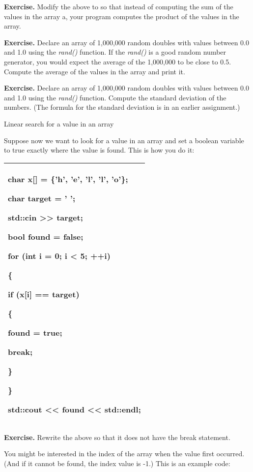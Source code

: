 \documentclass[
]{article}
\begin{document}
\textbf{Exercise.} Modify the above to so that instead of computing the
sum of the values in the array a, your program computes the product of
the values in the array.

\textbf{Exercise.} Declare an array of 1,000,000 random doubles with
values between 0.0 and 1.0 using the \emph{rand()} function. If the
\emph{rand()} is a good random number generator, you would expect the
average of the 1,000,000 to be close to 0.5. Compute the average of the
values in the array and print it.

\textbf{Exercise.} Declare an array of 1,000,000 random doubles with
values between 0.0 and 1.0 using the \emph{rand()} function. Compute the
standard deviation of the numbers. (The formula for the standard
deviation is in an earlier assignment.)

Linear search for a value in an array

Suppose now we want to look for a value in an array and set a boolean
variable to true exactly where the value is found. This is how you do
it:

\begin{longtable}[]{@{}l@{}}
\toprule
\endhead
\begin{minipage}[t]{0.97\columnwidth}\raggedright
char x{[}{]} = \{'h', 'e', 'l', 'l', 'o'\};

char target = ' ';

std::cin \textgreater\textgreater{} target;

bool found = false;

for (int i = 0; i \textless{} 5; ++i)

\{

if (x{[}i{]} == target)

\{

found = true;

break;

\}

\}

std::cout \textless\textless{} found \textless\textless{}
std::endl;\strut
\end{minipage}\tabularnewline
\bottomrule
\end{longtable}

\textbf{Exercise.} Rewrite the above so that it does not have the break
statement.

You might be interested in the index of the array when the value first
occurred. (And if it cannot be found, the index value is -1.) This is an
example code:
\end{document}
